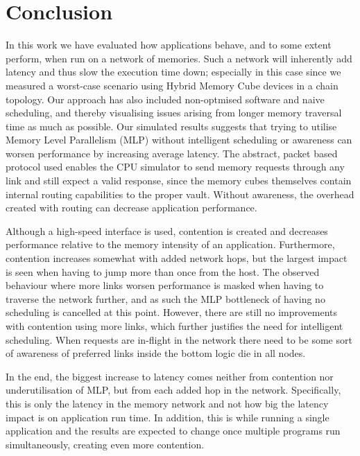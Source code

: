 \chapter{Conclusion}
In this work we have evaluated how applications behave, and to some extent perform, when run on a network of memories. Such a network will inherently add latency and thus slow the execution time down; especially in this case since we measured a worst-case scenario using Hybrid Memory Cube devices in a chain topology. Our approach has also included non-optmised software and naive scheduling, and thereby visualising issues arising from longer memory traversal time as much as possible. Our simulated results suggests that trying to utilise Memory Level Parallelism (MLP) without intelligent scheduling or awareness can worsen performance by increasing average latency. The abstract, packet based protocol used enables the CPU simulator to send memory requests through any link and still expect a valid response, since the memory cubes themselves contain internal routing capabilities to the proper vault. Without awareness, the overhead created with routing can decrease application performance. 
\bigskip

Although a high-speed interface is used, contention is created and decreases performance relative to the memory intensity of an application. Furthermore, contention increases somewhat with added network hops, but the largest impact is seen when having to jump more than once from the host. The observed behaviour where more links worsen performance is masked when having to traverse the network further, and as such the MLP bottleneck of having no scheduling is cancelled at this point. However, there are still no improvements with contention using more links, which further justifies the need for intelligent scheduling. When requests are in-flight in the network there need to be some sort of awareness of preferred links inside the bottom logic die in all nodes. 
\bigskip

In the end, the biggest increase to latency comes neither from contention nor underutilisation of MLP, but from each added hop in the network. Specifically, this is only the latency in the memory network and not how big the latency impact is on application run time. In addition, this is while running a single application and the results are expected to change once multiple programs run simultaneously, creating even more contention.